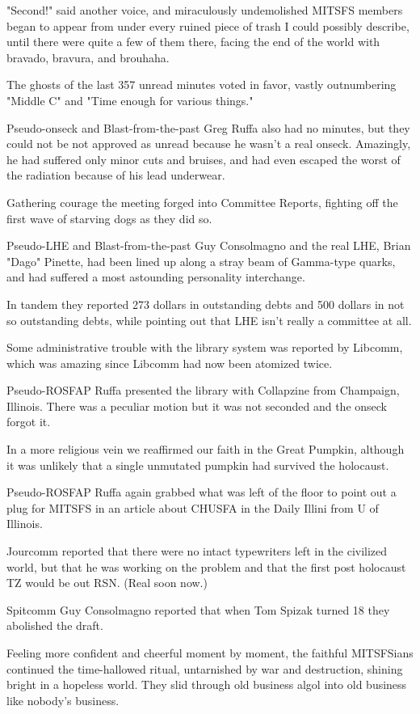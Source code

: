 \documentclass[12pt]{article}
\begin{document}
"Second!" said another voice, and miraculously undemolished MITSFS members began to appear from under every ruined piece of trash I could possibly describe, until there were quite a few of them there, facing the end of the world with bravado, bravura, and brouhaha.

The ghosts of the last 357 unread minutes voted in favor, vastly outnumbering "Middle C" and "Time enough for various things."

Pseudo-onseck and Blast-from-the-past Greg Ruffa also had no minutes, but they could not be not approved as unread because he wasn't a real onseck. Amazingly, he had suffered only minor cuts and bruises, and had even escaped the worst of the radiation because of his lead underwear.

Gathering courage the meeting forged into Committee Reports, fighting off the first wave of starving dogs as they did so.

Pseudo-LHE and Blast-from-the-past Guy Consolmagno and the real LHE, Brian "Dago" Pinette, had been lined up along a stray beam of Gamma-type quarks, and had suffered a most astounding personality interchange.

In tandem they reported 273 dollars in outstanding debts and 500 dollars in not so outstanding debts, while pointing out that LHE isn't really a committee at all.

Some administrative trouble with the library system was reported by Libcomm, which was amazing since Libcomm had now been atomized twice.

Pseudo-ROSFAP Ruffa presented the library with Collapzine from Champaign, Illinois. There was a peculiar motion but it was not seconded and the onseck forgot it.

In a more religious vein we reaffirmed our faith in the Great Pumpkin, although it was unlikely that a single unmutated pumpkin had survived the holocaust.

Pseudo-ROSFAP Ruffa again grabbed what was left of the floor to point out a plug for MITSFS in an article about CHUSFA in the Daily Illini from U of Illinois.

Jourcomm reported that there were no intact typewriters left in the civilized world, but that he was working on the problem and that the first post holocaust TZ would be out RSN. (Real soon now.)

Spitcomm Guy Consolmagno reported that when Tom Spizak turned 18 they abolished the draft.

Feeling more confident and cheerful moment by moment, the faithful MITSFSians continued the time-hallowed ritual, untarnished by war and destruction, shining bright in a hopeless world. They slid through old business algol into old business like nobody's business.
\end{document}
